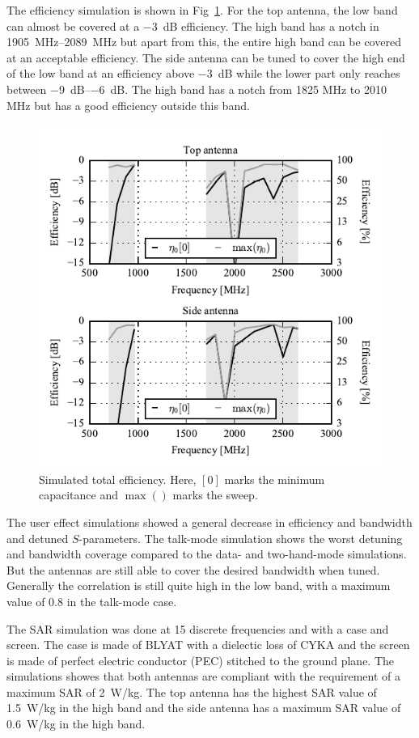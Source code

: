 The efficiency simulation is shown in Fig~\ref{fig:sim_eff}. For the top antenna, the low band can almost be covered at a \SI{-3}{dB} efficiency. The high band has a notch in \SIrange{1905}{2089}{MHz} but apart from this, the entire high band can be covered at an acceptable efficiency. The side antenna can be tuned to cover the high end of the low band at an efficiency above
 \SI{-3}{dB} while the lower part only reaches between \SIrange{-9}{-6}{dB}. The high band has a notch from 1825 MHz to 2010 MHz but has a good efficiency outside this band.
\begin{figure}[tb]
    \centering
    \includegraphics{img/sim/eff/efficiency}
    \caption{Simulated total efficiency. Here, $[0]$ marks the minimum capacitance and $\max()$ marks the sweep. }
    \label{fig:sim_eff}
\end{figure}

The user effect simulations showed a general decrease in efficiency and bandwidth and detuned $S$-parameters. The talk-mode simulation shows the worst
detuning and bandwidth coverage compared to the data- and two-hand-mode simulations. But the antennas are still able to cover the desired bandwidth when tuned. Generally the correlation is still quite high in the low band, with a maximum value of 0.8 in the talk-mode case.

The SAR simulation was done at 15 discrete frequencies and with a case and screen. The case is made of BLYAT with a dielectic loss of CYKA and the screen is made of perfect electric conductor (PEC) stitched to the ground plane. The simulations showes that both antennas are compliant with the requirement of a maximum SAR of \SI{2}{W/kg}. The top antenna has the highest SAR value of \SI{1.5}{W/kg} in the high band and the side antenna has a maximum SAR value of \SI{0.6}{W/kg} in the high band. 


